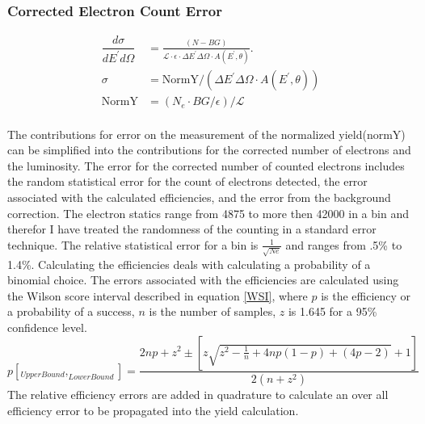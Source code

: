 \subsubsection{Corrected Electron Count Error}
\begin{align}
\dfrac{d\sigma}{dE^{\prime}d\Omega} &= \frac{(N - BG)}{\mathscr{L} \cdot \epsilon \cdot \Delta E^{\prime} \Delta \Omega \cdot A(E^{\prime},\theta)}. \nonumber\\
\sigma &= \text{NormY}/\left(\Delta E^{\prime} \Delta \Omega \cdot A(E^{\prime},\theta)\right)\nonumber\\
\text{NormY} &= \left(N_e \cdot BG/\epsilon \right) / \mathscr{L}
\end{align}

\paragraph{}
The contributions for error on the measurement of the normalized yield(normY) can be simplified into the contributions for the corrected number of electrons and the luminosity. The error for the corrected number of counted electrons includes the random statistical error for the count of electrons detected, the error associated with the calculated efficiencies, and the error from the background correction. The electron statics range from 4875 to more then 42000 in a bin and therefor I have treated the randomness of the counting in a standard error technique. The relative statistical error for a bin is $\frac{1}{\sqrt{Ne}}$ and ranges from .5\% to 1.4\%. Calculating the efficiencies deals with calculating a probability of a binomial choice. The errors associated with the efficiencies are calculated using the Wilson score interval described in equation \ref{WSI}, where $p$ is the efficiency or a probability of a success, $n$ is the number of samples, $z$ is 1.645 for a 95\% confidence level. 
\begin{equation}
p[_{UpperBound},_{LowerBound}] = \frac{ 2np +z^2 \pm \left[z\sqrt{z^2 - \frac{1}{n} + 4np(1-p) +(4p-2)} + 1 \right]}{2(n+z^2)} \label{WSI}
\end{equation}
The relative efficiency errors are added in quadrature to calculate an over all efficiency error to be propagated into the yield calculation.

